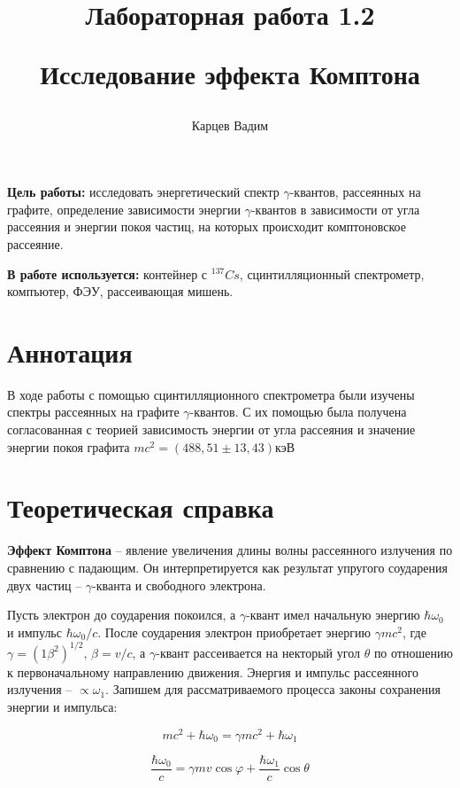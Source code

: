 \documentclass[12pt]{article}
\author{Карцев Вадим}
\title{Лабораторная работа 1.2

Исследование эффекта Комптона}
\begin{document}
  \maketitle

  \tableofcontents

  \vspace{1cm}

  \textbf{Цель работы:} исследовать энергетический спектр $\gamma$-квантов,
  рассеянных на графите, определение зависимости энергии $\gamma$-квантов в
  зависимости от угла рассеяния и энергии покоя частиц, на которых происходит
  комптоновское рассеяние.

  \textbf{В работе используется:} контейнер с $^{137}Cs$, сцинтилляционный
  спектрометр, компъютер, ФЭУ, рассеивающая мишень.

  \section{Аннотация}

    В ходе работы с помощью сцинтилляционного спектрометра были изучены спектры
    рассеянных на графите $\gamma$-квантов. С их помощью была получена
    согласованная с теорией зависимость энергии от угла рассеяния и значение
    энергии покоя графита $mc^2 = (488,51 \pm 13,43) кэВ$

  \section{Теоретическая справка}

    \textbf{Эффект Комптона} -- явление увеличения длины волны рассеянного
    излучения по сравнению с падающим. Он интерпретируется как результат
    упругого соударения двух частиц -- $\gamma$-кванта и свободного электрона.

    Пусть электрон до соударения покоился, а $\gamma$-квант имел начальную
    энергию $\hbar \omega_0$ и импульс $\hbar \omega_0 / c$. После соударения
    электрон приобретает энергию $\gamma m c^2$, где $\gamma =
    (1 \beta^2)^{1/2}$, $\beta = v / c$, а $\gamma$-квант рассеивается на
    некторый угол $\theta$ по отношению к первоначальному направлению движения.
    Энергия и импульс рассеянного излучения -- $\propto \omega_1$. Запишем для
    рассматриваемого процесса законы сохранения энергии и импульса:

    $$
      mc^2 + \hbar \omega_0 = \gamma m c^2 + \hbar \omega_1
    $$

    $$
      \frac{\hbar \omega_0}{c} = \gamma m v \cos \varphi +
      \frac{\hbar \omega_1}{c} \cos \theta
    $$
\end{document}
